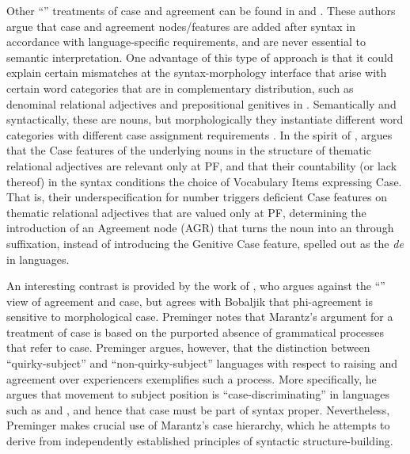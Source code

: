 \documentclass[output=paper]{langsci/langscibook}
\begin{document}
Other ``'' treatments of case and agreement can be found in \citet{Embick2006} and \citet{Marchis2015,Marchis2018}. These authors argue that case and agreement nodes\slash features are added after syntax in accordance with language-specific requirements, and are never essential to semantic interpretation. One advantage of this type of approach is that it could explain certain mismatches at the syntax-morphology interface that arise with certain word categories that are in complementary distribution, such as denominal relational adjectives and prepositional genitives in . Semantically and syntactically, these are nouns, but morphologically they instantiate different word categories with different case assignment requirements \citep{Marchis2018}. In the spirit of \citet{Embick2006},  \citet{Marchis2015,Marchis2018} argues that the Case features of the underlying nouns in the structure of thematic relational adjectives are relevant only at PF, and that their countability (or lack thereof) in the syntax conditions the choice of Vocabulary Items expressing Case. That is, their underspecification for number triggers deficient Case features on thematic relational adjectives that are valued only at PF, determining the introduction of an Agreement node (AGR) that turns the noun into an  through suffixation, instead of introducing the Genitive Case feature, spelled out as the  \textit{de} in  languages. 

An interesting contrast is provided by the work of \citet{Preminger2014}, who argues against the ``'' view of agreement and case, but agrees with Bobaljik that phi-agreement is sensitive to morphological case. Preminger notes that Marantz’s argument for a  treatment of case is based on the purported absence of grammatical processes that refer to case. Preminger argues, however, that the distinction between ``quirky-subject'' and ``non-quirky-subject'' languages with respect to raising and agreement over experiencers exemplifies such a process. More specifically, he argues that movement to subject position is ``case-discriminating'' in languages such as  and , and hence that case must be part of syntax proper. Nevertheless, Preminger makes crucial use of Marantz’s case hierarchy, which he attempts to derive from independently established principles of syntactic structure-building.
\end{document}
